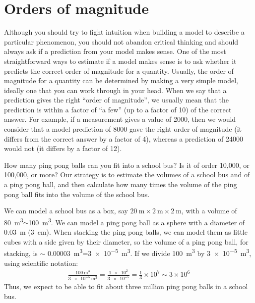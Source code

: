 \section{Orders of magnitude}
Although you should try to fight intuition when building a model to describe a particular phenomenon, you should not abandon critical thinking and should always ask if a prediction from your model makes sense. One of the most straightforward ways to estimate if a model makes sense is to ask whether it predicts the correct order of magnitude for a quantity. Usually, the order of magnitude for a quantity can be determined by making a very simple model, ideally one that you can work through in your head. When we say that a prediction gives the right ``order of magnitude'', we usually mean that the prediction is within a factor of ``a few'' (up to a factor of 10) of the correct answer. For example, if a measurement gives a value of 2000, then we would consider that a model prediction of 8000 gave the right order of magnitude (it differs from the correct answer by a factor of 4), whereas a prediction of 24000 would not (it differs by a factor of 12). 

\begin{example}{How many ping pong balls can you fit into a school bus? Is it of order 10,000, or 100,000, or more?}
Our strategy is to estimate the volumes of a school bus and of a ping pong ball, and then calculate how many times the volume of the ping pong ball fits into the volume of the school bus.

We can model a school bus as a box, say $\SI{20}{\meter}\times \SI{2}{\meter}\times\SI{2}{\meter}$, with a volume of \SI{80}{\meter\cubed}$\sim$\SI{100}{\meter\cubed}. We can model a ping pong ball as a sphere with a diameter of \SI{0.03}{\meter} (\SI{3}{\centi\meter}). When stacking the ping pong balls, we can model them as little cubes with a side given by their diameter, so the volume of a ping pong ball, for stacking, is $\sim$ \SI{0.00003}{\meter\cubed}=\SI{3e-5}{\meter\cubed}. If we divide \SI{100}{\meter\cubed} by \SI{3e-5}{\meter\cubed}, using scientific notation:
\begin{align*}
\frac{\SI{100}{\meter\cubed}}{\SI{3e-5}{\meter\cubed}}=\frac{\num{1e2}}{\num{3e-5}}=\frac{1}{3}\times 10^7\sim 3\times 10^6
\end{align*}
Thus, we expect to be able to fit about three million ping pong balls in a school bus. 


\end{example}

